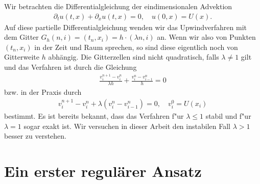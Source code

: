 Wir betrachten die Differentialgleichung der eindimensionalen Advektion
\begin{align}\label{eq:adv:pde}
\partial_t u(t, x) + \partial_x u(t, x) = 0, \quad u(0, x) = U(x).
\end{align}
Auf diese partielle Differentialgleichung wenden wir das Upwindverfahren mit dem Gitter $G_h(n,i) = (t_n, x_i) = h \cdot (\lambda n, i)$ an.
Wenn wir also von Punkten $(t_n, x_i)$ in der Zeit und Raum sprechen, so sind diese eigentlich noch von Gitterweite $h$ abhängig. 
Die Gitterzellen sind nicht quadratisch, falls $\lambda \neq 1$ gilt und das Verfahren ist durch die Gleichung
\begin{align}\label{eq:adv:scheme_rechnung}
\frac {v^{n+1}_i - v^n_i} {\lambda h} + \frac {v^n_i - v^n_{i-1}} h = 0
\end{align}
bzw. in der Praxis durch
\begin{align}\label{eq:adv:scheme}
v^{n+1}_i - v^n_i + \lambda (v^n_i - v^n_{i-1}) = 0, \quad v^0_i = U(x_i)
\end{align}
bestimmt.
Es ist bereits bekannt, dass das Verfahren f"ur $\lambda \leq 1$ stabil und f"ur $\lambda = 1$ sogar exakt ist.
Wir versuchen in dieser Arbeit den instabilen Fall $\lambda > 1$ besser zu verstehen.

\section{Ein erster regulärer Ansatz}

